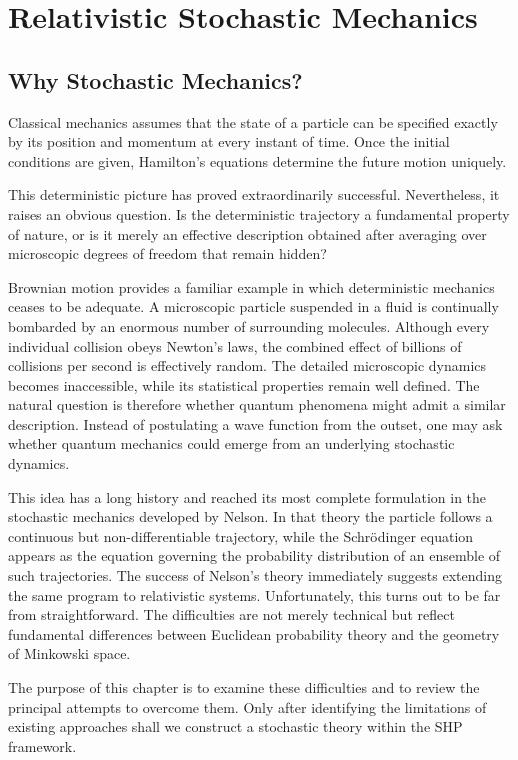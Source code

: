 \chapter{Relativistic Stochastic Mechanics}
\section{Why Stochastic Mechanics?}
Classical mechanics assumes that the state of a particle can be
specified exactly by its position and momentum at every instant of
time. Once the initial conditions are given, Hamilton's equations
determine the future motion uniquely.

This deterministic picture has proved extraordinarily successful.
Nevertheless, it raises an obvious question. Is the deterministic
trajectory a fundamental property of nature, or is it merely an
effective description obtained after averaging over microscopic degrees
of freedom that remain hidden?

Brownian motion provides a familiar example in which deterministic
mechanics ceases to be adequate. A microscopic particle suspended in a
fluid is continually bombarded by an enormous number of surrounding
molecules. Although every individual collision obeys Newton's laws, the
combined effect of billions of collisions per second is effectively
random. The detailed microscopic dynamics becomes inaccessible, while
its statistical properties remain well defined.
The natural question is therefore whether quantum phenomena might admit
a similar description. Instead of postulating a wave function from the
outset, one may ask whether quantum mechanics could emerge from an
underlying stochastic dynamics.

This idea has a long history and reached its most complete formulation
in the stochastic mechanics developed by Nelson. In that theory the
particle follows a continuous but non-differentiable trajectory, while
the Schrödinger equation appears as the equation governing the
probability distribution of an ensemble of such trajectories.
The success of Nelson's theory immediately suggests extending the same
program to relativistic systems. Unfortunately, this turns out to be
far from straightforward. The difficulties are not merely technical but
reflect fundamental differences between Euclidean probability theory and
the geometry of Minkowski space.

The purpose of this chapter is to examine these difficulties and to
review the principal attempts to overcome them. Only after identifying
the limitations of existing approaches shall we construct a stochastic
theory within the SHP framework.
